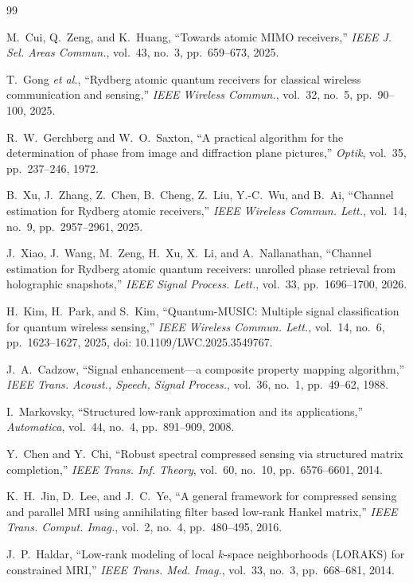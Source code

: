 \documentclass[journal]{IEEEtran}
\begin{document}
\begin{thebibliography}{99}

M.~Cui, Q.~Zeng, and K.~Huang,
``Towards atomic MIMO receivers,''
\emph{IEEE J. Sel. Areas Commun.},
vol.~43, no.~3, pp.~659--673, 2025.

T.~Gong \emph{et al.},
``Rydberg atomic quantum receivers for classical wireless communication and sensing,''
\emph{IEEE Wireless Commun.},
vol.~32, no.~5, pp.~90--100, 2025.

R.~W.~Gerchberg and W.~O.~Saxton,
``A practical algorithm for the determination of phase from image and diffraction plane pictures,''
\emph{Optik},
vol.~35, pp.~237--246, 1972.

B.~Xu, J.~Zhang, Z.~Chen, B.~Cheng, Z.~Liu, Y.-C.~Wu, and B.~Ai,
``Channel estimation for Rydberg atomic receivers,''
\emph{IEEE Wireless Commun. Lett.},
vol.~14, no.~9, pp.~2957--2961, 2025.

J.~Xiao, J.~Wang, M.~Zeng, H.~Xu, X.~Li, and A.~Nallanathan,
``Channel estimation for Rydberg atomic quantum receivers:
unrolled phase retrieval from holographic snapshots,''
\emph{IEEE Signal Process. Lett.},
vol.~33, pp.~1696--1700, 2026.

H.~Kim, H.~Park, and S.~Kim,
``Quantum-MUSIC: Multiple signal classification for quantum wireless sensing,''
\emph{IEEE Wireless Commun. Lett.}, vol.~14, no.~6,
pp.~1623--1627, 2025, doi: 10.1109/LWC.2025.3549767.

J.~A.~Cadzow,
``Signal enhancement---a composite property mapping algorithm,''
\emph{IEEE Trans. Acoust., Speech, Signal Process.},
vol.~36, no.~1, pp.~49--62, 1988.

I.~Markovsky,
``Structured low-rank approximation and its applications,''
\emph{Automatica},
vol.~44, no.~4, pp.~891--909, 2008.

Y.~Chen and Y.~Chi,
``Robust spectral compressed sensing via structured matrix completion,''
\emph{IEEE Trans. Inf. Theory},
vol.~60, no.~10, pp.~6576--6601, 2014.

K.~H.~Jin, D.~Lee, and J.~C.~Ye,
``A general framework for compressed sensing and parallel MRI using annihilating filter based low-rank Hankel matrix,''
\emph{IEEE Trans. Comput. Imag.},
vol.~2, no.~4, pp.~480--495, 2016.

J.~P.~Haldar,
``Low-rank modeling of local $k$-space neighborhoods (LORAKS) for constrained MRI,''
\emph{IEEE Trans. Med. Imag.},
vol.~33, no.~3, pp.~668--681, 2014.


\end{thebibliography}
\end{document}

